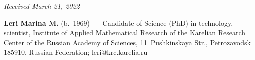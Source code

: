 \vspace*{-6pt}

\hfill{\small\textit{Received March 21, 2022}}


\Contrl

\noindent
\textbf{Leri Marina M.} (b.\ 1969)~--- Candidate of Science (PhD) in technology, scientist,
Institute of Applied Mathematical Research of the Karelian Research Center of the Russian Academy of Sciences,
11~Pushkinskaya Str., Petrozavodsk 185910, Russian Federation; \mbox{leri@krc.karelia.ru}


\label{end\stat}

\renewcommand{\bibname}{\protect\rm Литература} 